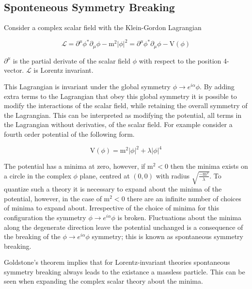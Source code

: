 \subsection{Sponteneous Symmetry Breaking}

Consider a complex scalar field \phi with the Klein-Gordon Lagrangian

\begin{equation}
\mathcal{L} = \partial^{\mu} \phi^{*} \partial_{\mu} \phi - \text{m}^{2} |\phi|^{2} = \partial^{\mu} \phi^{*} \partial_{\mu} \phi - \text{V}(\phi)
\end{equation}

$\partial^{\mu}$ is the partial derivate of the scalar field $\phi$ with respect to the position 4-vector.  $\mathcal{L}$ is Lorentz invariant.

This Lagrangian is invariant under the global symmetry $\phi \rightarrow e^{i\alpha} \phi$.  By adding extra terms to the Lagrangian that obey this global symmetry it is possible to modify the interactions of the scalar field, while retaining the overall symmetry of the Lagrangian.  This can be interpreted as modifying the potential, all terms in the Lagrangian without derivaties, of the scalar field.  For example consider a fourth order potential of the following form.

\begin{equation}
\text{V}(\phi) = \text{m}^{2}|\phi|^{2} + \lambda |\phi|^{4}
\end{equation}

The potential has a minima at zero, however, if $\text{m}^{2} < 0$ then the minima exists on a circle in the complex $\phi$ plane, centred at $(0,0)$ with radius $\sqrt{\frac{-\text{m}^{2}}{\lambda}}$.  To quantize such a theory it is necessary to expand about the minima of the potential, however, in the case of $\text{m}^{2} < 0$ there are an infinite number of choices of minima to expand about.  Irrespective of the choice of minima for this configuration the symmetry $\phi \rightarrow e^{i\alpha} \phi$ is broken.  Fluctuations about the minima along the degenerate direction leave the potential unchanged is a consequence of the breaking of the $\phi \rightarrow e^{i\alpha} \phi$ symmetry; this is known as spontaneous symmetry breaking.

Goldstone's theorem implies that for Lorentz-invariant theories spontaneous symmetry breaking always leads to the existance a massless particle.  This can be seen when expanding the complex scalar theory about the minima.

